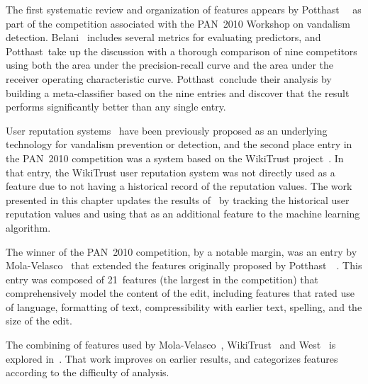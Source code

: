 The first systematic review and organization of features appears
by Potthast~\etal~\cite{Potthast2010b} as part of the competition
associated with the PAN~2010 Workshop on vandalism
detection.
Belani~\cite{Belani2010} includes several metrics for evaluating
predictors, and Potthast~\etal take up the discussion with a thorough
comparison of nine competitors using both the area under the
precision-recall curve and the area under the receiver operating
characteristic curve.
Potthast~\etal conclude their analysis by building a meta-classifier
based on the nine entries and discover that the result performs
significantly better than any single entry.

User reputation systems~\cite{Zeng2006,WikiMTWtrust06,Adler2007}
have been previously proposed as an underlying technology for
vandalism prevention or detection, and the second place entry in
the PAN~2010 competition was a system based on the
WikiTrust project~\cite{Adler2010b}.
In that entry, the WikiTrust user reputation system was not
directly used as a feature due to not having a historical record
of the reputation values.
The work presented in this chapter updates the results of~\cite{Adler2010b} by
tracking the historical user reputation values and using that
as an additional feature to the machine learning algorithm.

The winner of the PAN~2010 competition, by a notable margin, was
an entry by Mola-Velasco~\cite{Mola2010} that extended the features
originally proposed by Potthast~\etal~\cite{Potthast2008}.
This entry was composed of 21~features (the largest in the
competition) that comprehensively model the content of the edit,
including features that rated use of language, formatting of text,
compressibility with earlier text, spelling,
and the size of the edit.

The combining of features used by Mola-Velasco~\cite{Mola2010},
WikiTrust~\cite{Adler2010b} and West~\cite{West2010}
is explored in~\cite{Adler2011a}.
That work improves on earlier results, and categorizes features
according to the difficulty of analysis.


